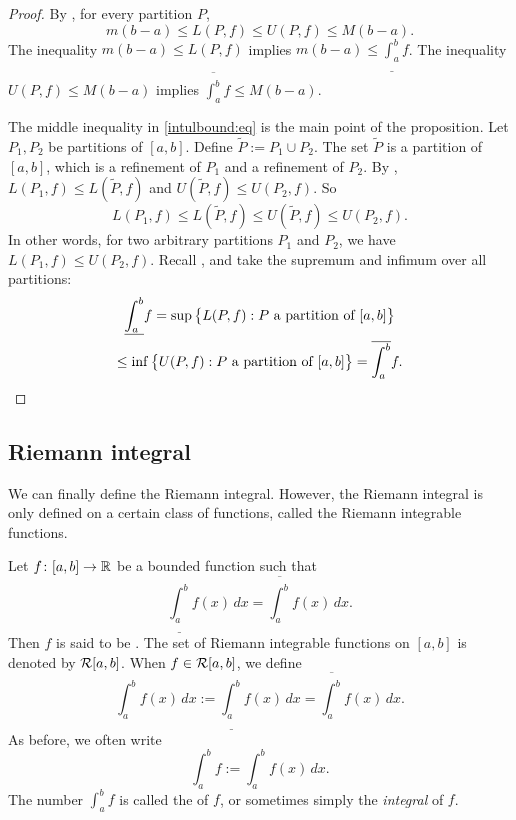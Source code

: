 \begin{proof}
By , for every partition $P$,
\begin{equation*}
m(b-a) \leq L(P,f) \leq U(P,f) \leq M(b-a).
\end{equation*}
The inequality
$m(b-a) \leq L(P,f)$ implies $m(b-a) \leq \underline{\int_a^b} f$.
The inequality
$U(P,f) \leq M(b-a)$ implies $\overline{\int_a^b} f \leq M(b-a)$.

The middle inequality in
\eqref{intulbound:eq} is the main point of the proposition.
Let $P_1, P_2$ be partitions of $[a,b]$.  Define 
$\widetilde{P} := P_1 \cup P_2$.
The set $\widetilde{P}$ is a partition of $[a,b]$, which
is a refinement of $P_1$ and a refinement of $P_2$.
By ,
$L(P_1,f) \leq L(\widetilde{P},f)$ and
$U(\widetilde{P},f) \leq U(P_2,f)$.  So
\begin{equation*}
L(P_1,f) \leq L(\widetilde{P},f) \leq U(\widetilde{P},f) \leq U(P_2,f) .
\end{equation*}
In other words, for two arbitrary partitions $P_1$ and $P_2$, we have
$L(P_1,f) \leq U(P_2,f)$.  
Recall , and take the supremum and
infimum over all partitions:
\begin{multline*}
\underline{\int_a^b} f = 
\sup \, \bigl\{ L(P,f) : P \text{ a partition of } [a,b] \bigr\}
\\
\leq
\inf \, \bigl\{ U(P,f) : P \text{ a partition of } [a,b] \bigr\}
=
\overline{\int_a^b} f . \qedhere
\end{multline*}
\end{proof}

\subsection{Riemann integral}

We can finally define the Riemann integral.  However, the Riemann
integral is only defined on a certain class of functions, called the
Riemann integrable functions.

\begin{defn}
Let $f \colon [a,b] \to {\mathbb{R}}$ be a bounded function such that
\begin{equation*}
\underline{\int_a^b} f(x)\,dx = \overline{\int_a^b} f(x)\,dx .
\end{equation*}
Then $f$ is said to be \emph{}.
The set of Riemann integrable functions on $[a,b]$ is denoted
by ${\mathcal{R}}[a,b]$.
When $f \in {\mathcal{R}}[a,b]$, we define
\begin{equation*}
\int_a^b f(x)\,dx := 
\underline{\int_a^b} f(x)\,dx = \overline{\int_a^b} f(x)\,dx .
\end{equation*}
As before, we often write
\begin{equation*}
\int_a^b f := \int_a^b f(x)\,dx.
\end{equation*}
The number $\int_a^b f$ is called the \emph{}
of $f$, or sometimes simply the \emph{integral} of $f$.
\end{defn}

